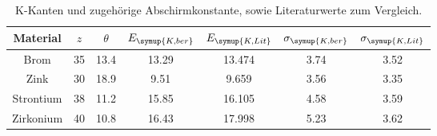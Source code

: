 \begin{table}[!htp]
\centering
\caption{K-Kanten und zugehörige Abschirmkonstante, sowie Literaturwerte zum Vergleich.}
\label{tab:messung}
\begin{tabular}{c c c c c c c}
\toprule
{{Material}} & {{$z$}} & {{$\theta$}} & {{$E_{\symup{K, ber}}$}}  & {{$E_{\symup{K, Lit}}$}}  & {{$\sigma_{\symup{K, ber}}$}} & {{$\sigma_{\symup{K, Lit}}$}} \\
\midrule
Brom &      35  & 13.4 & 13.29 & 13.474 & 3.74  & 3.52 \\
Zink &      30  & 18.9 & 9.51  &  9.659 & 3.56  & 3.35 \\
Strontium & 38  & 11.2 & 15.85 & 16.105 & 4.58  & 3.59 \\
Zirkonium & 40  & 10.8 & 16.43 & 17.998 & 5.23  & 3.62 \\
\bottomrule
\end{tabular}
\end{table}
